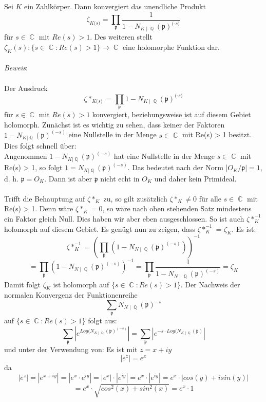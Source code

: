 \documentclass[10pt,a4paper]{article}
\DeclareMathOperator{\C}{\mathbb{C}}
\DeclareMathOperator{\Q}{\mathbb{Q}}
\begin{document}
Sei $\textit{K}$ ein Zahlkörper. Dann konvergiert das unendliche Produkt $$\zeta_{\textit{K} \textit{(s)}}= \prod_{\mathfrak{p}}\frac{1}{1- N_{\textit{K}\mid\Q}(\mathfrak{p})^\textit{(-s)}}$$ für $s \in \C $ mit $ Re(s) > 1$. Des weiteren stellt $\zeta_{K}(s)\colon \{ s \in \C \colon Re(s)>1\} \rightarrow \C$ eine holomorphe Funktion dar.
\\
\\
\textit{Beweis}:
\\
\\
Der Ausdruck
$$\zeta*_{\textit{K} \textit{(s)}}= \prod_{\mathfrak{p}}1- N_{\textit{K}\mid\Q}(\mathfrak{p})^\textit{(-s)}$$ für $s \in \C$ mit $Re(s) > 1$ konvergiert, beziehungsweise ist auf diesem Gebiet holomorph.
Zunächst ist es wichtig zu sehen, dass keiner der Faktoren $ 1- N_{K|\Q}(\mathfrak{p})^{(-s)}$ eine Nullstelle in der Menge $s \in \C$ mit Re(s) > 1 besitzt.
\\
Dies folgt schnell über: 
\\
Angenommen $1- N_{K|\Q}(\mathfrak{p})^{(-s)}$ hat eine Nullstelle in der Menge  $s \in \C $ mit Re(s) > 1, so folgt $1 = N_{K|\Q}(\mathfrak{p})^{(-s)}$. Das bedeutet nach der Norm |$O_K /\mathfrak{p}| = 1$, d. h. $\mathfrak{p} = O_K$. Dann ist aber $\mathfrak{p}$ nicht echt in $O_K$ und daher kein Primideal. \\
\\
Trifft die Behauptung auf $\zeta*_{K}$ zu, so gilt zusätzlich $\zeta*_{K} \neq 0$ für alle  $s \in \C$ mit Re(s) > 1. Denn wäre  $\zeta*_{K} = 0$, so wäre nach oben stehenden Satz mindestens ein Faktor gleich Null. Dies haben wir aber eben ausgeschlossen. So ist auch  $\zeta*_{K}^{-1}$ holomorph auf diesem Gebiet. Es genügt nun zu zeigen, dass 
$\zeta*_{K}^{-1}$ = $\zeta_{K}$. Es ist: $$\zeta*_{K}^{-1}=(\prod_{\mathfrak{p}}(1 - N_{N\mid\Q}(\mathfrak{p})^{(-s)}))^{-1} $$ $$=\prod_{\mathfrak{p}}(1 - N_{N\mid\Q}(\mathfrak{p})^{(-s)})^{-1} = \prod_{\mathfrak{p}}\frac{1}{1 - N_{N\mid\Q}(\mathfrak{p})^{(-s)}}=\zeta_{K}$$
Damit folgt $\zeta_{K}$ ist holomorph auf $\{ s \in \C \colon Re(s) > 1\}$. Der Nachweis der normalen Konvergenz der Funktionenreihe $$\sum_{\mathfrak{p}}N_{N\mid\Q}(\mathfrak{p})^{-s}$$ auf $\{ s \in \C \colon Re(s) > 1\}$ folgt aus:$$\sum_{\mathfrak{p}}|e^{Log(N_{K\mid \Q}(\mathfrak{p})^{(-s)}}| = \sum_{\mathfrak{p}}|e^{-s\cdot Log(N_{K\mid \Q}(\mathfrak{p})}|$$
 und unter der Verwendung von: 
 Es ist mit $z = x + iy$ $$|e^z| = e^x $$ da $$|e^z|=|e^{x+iy}|=|e^{x}\cdot e^{iy}|= |e^{x}|\cdot |e^{iy}| = e^{x}\cdot |e^{iy}| = e^x \cdot |cos(y)+isin(y)| $$ $$= e^x\cdot\sqrt{cos^2(x)+sin^2(x)} =e^x\cdot 1$$
\end{document}
